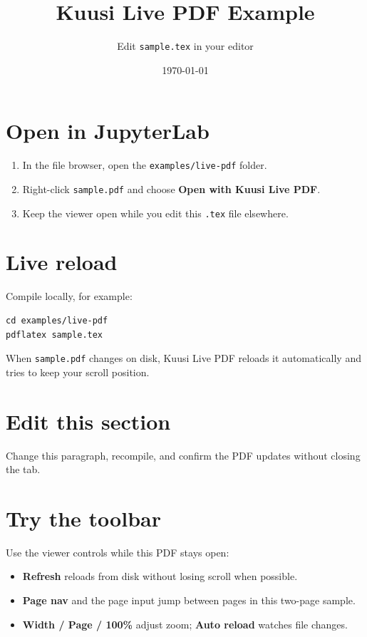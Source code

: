 \documentclass[11pt]{article}
\title{Kuusi Live PDF Example}
\author{Edit \texttt{sample.tex} in your editor}
\date{\today}
\begin{document}
\maketitle

\section{Open in JupyterLab}

\begin{enumerate}
  \item In the file browser, open the \texttt{examples/live-pdf} folder.
  \item Right-click \texttt{sample.pdf} and choose \textbf{Open with Kuusi Live PDF}.
  \item Keep the viewer open while you edit this \texttt{.tex} file elsewhere.
\end{enumerate}

\section{Live reload}

Compile locally, for example:

\begin{verbatim}
cd examples/live-pdf
pdflatex sample.tex
\end{verbatim}

When \texttt{sample.pdf} changes on disk, Kuusi Live PDF reloads it automatically
and tries to keep your scroll position.

\section{Edit this section}

Change this paragraph, recompile, and confirm the PDF updates without closing
the tab.

\section{Try the toolbar}

Use the viewer controls while this PDF stays open:

\begin{itemize}
  \item \textbf{Refresh} reloads from disk without losing scroll when possible.
  \item \textbf{Page nav} and the page input jump between pages in this two-page sample.
  \item \textbf{Width / Page / 100\%} adjust zoom; \textbf{Auto reload} watches file changes.
\end{itemize}
\end{document}
